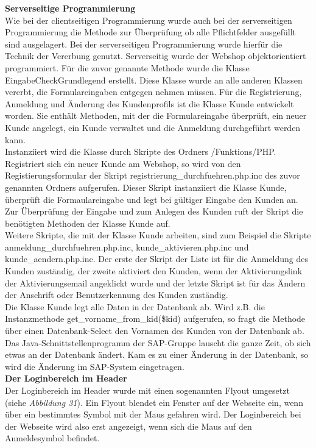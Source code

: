 \textbf{Serverseitige Programmierung}\\
Wie bei der clientseitigen Programmierung wurde auch bei der serverseitigen Programmierung die Methode zur Überprüfung ob alle Pflichtfelder ausgefüllt sind ausgelagert. Bei der serverseitigen Programmierung wurde hierfür die Technik der Vererbung genutzt. Serverseitig wurde der Webshop objektorientiert programmiert. Für die zuvor genannte Methode wurde die Klasse \glqq EingabeCheckGrundlegend\grqq{} erstellt. Diese Klasse wurde an alle anderen Klassen vererbt, die Formulareingaben entgegen nehmen müssen. Für die Registrierung, Anmeldung und Änderung des Kundenprofils ist die Klasse \glqq Kunde\grqq{} entwickelt worden. Sie enthält Methoden, mit der die Formulareingabe überprüft, ein neuer Kunde angelegt, ein Kunde verwaltet und die Anmeldung durchgeführt werden kann.\\
Instanziiert wird die Klasse durch Skripte des Ordners \glqq /Funktions/PHP\grqq{}. Registriert sich ein neuer Kunde am Webshop, so wird von den Registierungsformular der Skript \glqq registrierung\_durchfuehren.php.inc\grqq{} des zuvor genannten Ordners aufgerufen. Dieser Skript instanziiert die Klasse \glqq Kunde\grqq{}, überprüft die Formaulareingabe und legt bei gültiger Eingabe den Kunden an. Zur Überprüfung der Eingabe und zum Anlegen des Kunden ruft der Skript die benötigten Methoden der Klasse \glqq Kunde\grqq{} auf.\\
Weitere Skripte, die mit der Klasse \glqq Kunde\grqq{} arbeiten, sind zum Beispiel die Skripte \glqq anmeldung\_durchfuehren.php.inc\grqq{}, \glqq kunde\_aktivieren.php.inc\grqq{} und \glqq kunde\_aendern.php.inc\grqq{}. Der erste der Skript der Liste ist für die Anmeldung des Kunden zuständig, der zweite aktiviert den Kunden, wenn der Aktivierungslink der Aktivierungsemail angeklickt wurde und der letzte Skript ist für das Ändern der Anschrift oder Benutzerkennung des Kunden zuständig.\\
Die Klasse \glqq Kunde\grqq{} legt alle Daten in der Datenbank ab. Wird z.B. die Instanzmethode \glqq get\_vorname\_from\_kid(\$kid)\grqq{} aufgerufen, so fragt die Methode über einen Datenbank-Select den Vornamen des Kunden von der Datenbank ab. Das Java-Schnittstellenprogramm der SAP-Gruppe lauscht die ganze Zeit, ob sich etwas an der Datenbank ändert. Kam es zu einer Änderung in der Datenbank, so wird die Änderung im SAP-System eingetragen.\\

\textbf{Der Loginbereich im Header}\\
Der Loginbereich im Header wurde mit einen sogenannten \glqq Flyout\grqq{} umgesetzt (siehe \textit{Abbildung 31}). Ein Flyout blendet ein Fenster auf der Webseite ein, wenn über ein bestimmtes Symbol mit der Maus gefahren wird. Der Loginbereich bei der Webseite wird also erst angezeigt, wenn sich die Maus auf den Anmeldesymbol befindet. 

